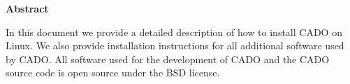 
\clearemptydoublepage
{}
{}	





\vspace*{2cm}
\begin{center}
{\Large \bf Abstract}
\end{center}
\vspace{1cm}
In this document we provide a detailed description of how to install CADO on Linux. We also provide installation instructions for all additional software used by CADO. All software used for the development of CADO and the CADO source code is open source under the BSD license.
